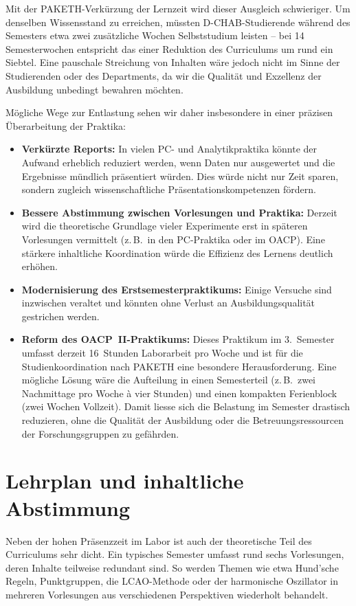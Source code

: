 \documentclass[a4paper]{article}
\begin{document}
Mit der PAKETH-Verkürzung der Lernzeit wird dieser Ausgleich schwieriger. Um denselben Wissensstand zu erreichen, müssten D-CHAB-Studierende während des Semesters etwa zwei zusätzliche Wochen Selbststudium leisten – bei 14 Semesterwochen entspricht das einer Reduktion des Curriculums um rund ein Siebtel. Eine pauschale Streichung von Inhalten wäre jedoch nicht im Sinne der Studierenden oder des Departments, da wir die Qualität und Exzellenz der Ausbildung unbedingt bewahren möchten.

Mögliche Wege zur Entlastung sehen wir daher insbesondere in einer präzisen Überarbeitung der Praktika:

\begin{itemize}
  \item \textbf{Verkürzte Reports:} In vielen PC- und Analytikpraktika könnte der Aufwand erheblich reduziert werden, wenn Daten nur ausgewertet und die Ergebnisse mündlich präsentiert würden. Dies würde nicht nur Zeit sparen, sondern zugleich wissenschaftliche Präsentationskompetenzen fördern.
  \item \textbf{Bessere Abstimmung zwischen Vorlesungen und Praktika:} Derzeit wird die theoretische Grundlage vieler Experimente erst in späteren Vorlesungen vermittelt (z.\,B.\ in den PC-Praktika oder im OACP). Eine stärkere inhaltliche Koordination würde die Effizienz des Lernens deutlich erhöhen.
  \item \textbf{Modernisierung des Erstsemesterpraktikums:} Einige Versuche sind inzwischen veraltet und könnten ohne Verlust an Ausbildungsqualität gestrichen werden.
  \item \textbf{Reform des OACP~II-Praktikums:} Dieses Praktikum im 3.\ Semester umfasst derzeit 16~Stunden Laborarbeit pro Woche und ist für die Studienkoordination nach PAKETH eine besondere Herausforderung. Eine mögliche Lösung wäre die Aufteilung in einen Semesterteil (z.\,B.\ zwei Nachmittage pro Woche à vier Stunden) und einen kompakten Ferienblock (zwei Wochen Vollzeit). Damit liesse sich die Belastung im Semester drastisch reduzieren, ohne die Qualität der Ausbildung oder die Betreuungsressourcen der Forschungsgruppen zu gefährden.
\end{itemize}

\section{Lehrplan und inhaltliche Abstimmung}

Neben der hohen Präsenzzeit im Labor ist auch der theoretische Teil des Curriculums sehr dicht. Ein typisches Semester umfasst rund sechs Vorlesungen, deren Inhalte teilweise redundant sind. So werden Themen wie etwa Hund’sche Regeln, Punktgruppen, die LCAO-Methode oder der harmonische Oszillator in mehreren Vorlesungen aus verschiedenen Perspektiven wiederholt behandelt.
\end{document}
